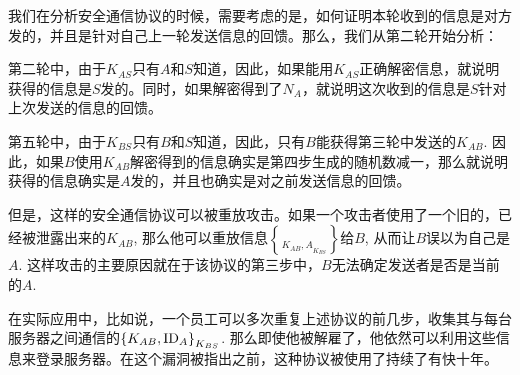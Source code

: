 我们在分析安全通信协议的时候，需要考虑的是，如何证明本轮收到的信息是对方发的，并且是针对自己上一轮发送信息的回馈。那么，我们从第二轮开始分析：\par
第二轮中，由于$K_{AS}$只有$A$和$S$知道，因此，如果能用$K_{AS}$正确解密信息，就说明获得的信息是$S$发的。同时，如果解密得到了$N_A$，就说明这次收到的信息是$S$针对上次发送的信息的回馈。\par
第五轮中，由于$K_{BS}$只有$B$和$S$知道，因此，只有$B$能获得第三轮中发送的$K_{AB}$. 因此，如果$B$使用$K_{AB}$解密得到的信息确实是第四步生成的随机数减一，那么就说明获得的信息确实是$A$发的，并且也确实是对之前发送信息的回馈。\par
但是，这样的安全通信协议可以被重放攻击。如果一个攻击者使用了一个旧的，已经被泄露出来的$K_{AB}$, 那么他可以重放信息$\brace{K_{AB}, A}_{K_{BS}}$给$B$, 从而让$B$误以为自己是$A$. 这样攻击的主要原因就在于该协议的第三步中，$B$无法确定发送者是否是当前的$A$.\par
在实际应用中，比如说，一个员工可以多次重复上述协议的前几步，收集其与每台服务器之间通信的$\left\{ {K_{AB}, \mathrm{ID}_A} \right\}_{K_{BS}}$. 那么即使他被解雇了，他依然可以利用这些信息来登录服务器。在这个漏洞被指出之前，这种协议被使用了持续了有快十年。
